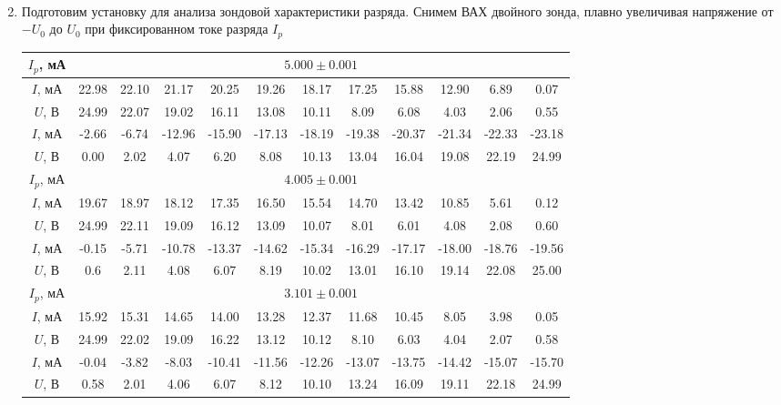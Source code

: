 \documentclass[a4paper, 12pt]{article}
\begin{document}
\begin{enumerate}
\begin{align}
    \end{align}
    \item Подготовим установку для анализа зондовой характеристики разряда. Снимем ВАХ двойного зонда, плавно увеличивая напряжение
    от $-U_{0}$ до $U_{0}$ при фиксированном токе разряда $I_{p}$
    \begin{center}
        \centering
        \begin{tabular}{|c|c|c|c|c|c|c|c|c|c|c|c|}
            \hline
            $I_{p}$, мА & \multicolumn{11}{|c|}{$5.000\pm 0.001$}\\
            \hline
            $I$, мА & 22.98 & 22.10 & 21.17 & 20.25 & 19.26 & 18.17 & 17.25 & 15.88 & 12.90 & 6.89 & 0.07\\
            $U$, В & 24.99 & 22.07 & 19.02 & 16.11 & 13.08 & 10.11 & 8.09 & 6.08 & 4.03 & 2.06 & 0.55\\
            \hline
            $I$, мА & -2.66 & -6.74 & -12.96 & -15.90 & -17.13 & -18.19 & -19.38 & -20.37 & -21.34 & -22.33 & -23.18\\
            $U$, В & 0.00 & 2.02 & 4.07 & 6.20 & 8.08 & 10.13 & 13.04 & 16.04 & 19.08 & 22.19 & 24.99\\
            \hline
            $I_{p}$, мА & \multicolumn{11}{|c|}{$4.005\pm 0.001$}\\
            \hline
            $I$, мА & 19.67 & 18.97 & 18.12 & 17.35 & 16.50 & 15.54 & 14.70 & 13.42 & 10.85 & 5.61 & 0.12\\
            $U$, В & 24.99 & 22.11 & 19.09 & 16.12 & 13.09 & 10.07 & 8.01 & 6.01 & 4.08 & 2.08 & 0.60\\
            \hline
            $I$, мА & -0.15 & -5.71 & -10.78 & -13.37 & -14.62 & -15.34 & -16.29 & -17.17 & -18.00 & -18.76 & -19.56\\
            $U$, В & 0.6 & 2.11 & 4.08 & 6.07 & 8.19 & 10.02 & 13.01 & 16.10 & 19.14 & 22.08 & 25.00\\
            \hline
            $I_{p}$, мА & \multicolumn{11}{|c|}{$3.101\pm 0.001$}\\
            \hline
            $I$, мА & 15.92 & 15.31 & 14.65 & 14.00 & 13.28 & 12.37 & 11.68 & 10.45 & 8.05 & 3.98 & 0.05\\
            $U$, В & 24.99 & 22.02 & 19.09 & 16.22 & 13.12 & 10.12 & 8.10 & 6.03 & 4.04 & 2.07 & 0.58\\
            \hline
            $I$, мА & -0.04 & -3.82 & -8.03 & -10.41 & -11.56 & -12.26 & -13.07 & -13.75 & -14.42 & -15.07 & -15.70\\
            $U$, В & 0.58 & 2.01 & 4.06 & 6.07 & 8.12 & 10.10 & 13.24 & 16.09 & 19.11 & 22.18 & 24.99\\

\end{tabular}
\end{center}
\end{enumerate}
\end{document}
